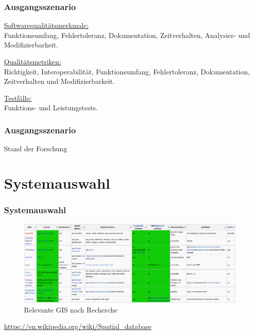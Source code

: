 \documentclass{beamer}
\begin{document}
\begin{frame}\frametitle{Ausgangsszenario}
\underline{Softwarequalitätsmerkmale:}\\
Funktionsumfang, Fehlertoleranz, Dokumentation, Zeitverhalten, Analysier- und Modifizierbarkeit.

\vspace{\baselineskip}
\vspace{\baselineskip}

\underline{Qualitätsmetriken:}\\
Richtigkeit, Interoperabilität, Funktionsumfang, Fehlertoleranz, Dokumentation, Zeitverhalten und Modifizierbarkeit.

\vspace{\baselineskip}
\vspace{\baselineskip}

\underline{Testfälle:}\\
Funktions- und Leistungstests.
\end{frame}

\begin{frame}\frametitle{Ausgangsszenario}
Stand der Forschung


\end{frame}

\section{Systemauswahl}

\begin{frame}\frametitle{Systemauswahl}
\begin{figure}
\centering
\includegraphics[width=1\hsize]{spatial_databases.png}
\caption{Relevante GIS nach Recherche}
\end{figure}
\begin{center}
\tiny
\url{https://en.wikipedia.org/wiki/Spatial_database}
\end{center}
\end{frame}
\end{document}
